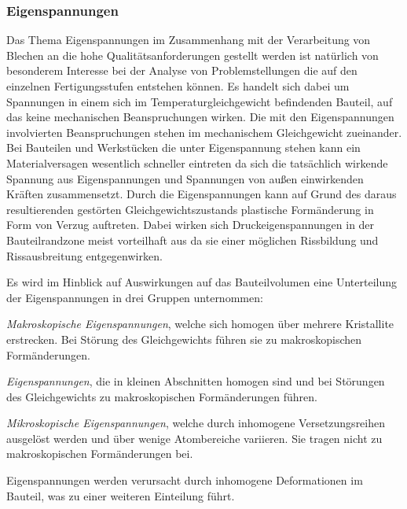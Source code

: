 \documentclass[12pt,a4paper,parskip]{scrartcl}
\begin{document}
{\subsubsection{Eigenspannungen}
Das Thema Eigenspannungen im Zusammenhang mit der Verarbeitung von Blechen an die hohe Qualitätsanforderungen gestellt werden ist natürlich von besonderem Interesse bei der Analyse von Problemstellungen die auf den einzelnen Fertigungsstufen entstehen können. Es handelt sich dabei um Spannungen in einem sich im Temperaturgleichgewicht befindenden Bauteil, auf das keine mechanischen Beanspruchungen wirken. Die mit den Eigenspannungen involvierten  Beanspruchungen stehen im mechanischem Gleichgewicht zueinander. Bei Bauteilen und Werkstücken die unter Eigenspannung stehen kann ein Materialversagen wesentlich schneller eintreten da sich die tatsächlich wirkende Spannung aus Eigenspannungen und Spannungen von außen einwirkenden Kräften zusammensetzt. Durch die Eigenspannungen kann auf Grund des daraus resultierenden gestörten Gleichgewichtszustands plastische Formänderung in Form von Verzug auftreten.
Dabei wirken sich Druckeigenspannungen in der Bauteilrandzone meist vorteilhaft aus da sie einer möglichen Rissbildung und Rissausbreitung entgegenwirken.

Es wird im Hinblick auf Auswirkungen auf das Bauteilvolumen eine Unterteilung der Eigenspannungen in drei Gruppen unternommen:
\begin{enumerate*}
\item \emph{Makroskopische Eigenspannungen}, welche sich homogen über mehrere Kristallite erstrecken. Bei Störung des Gleichgewichts führen sie zu makroskopischen Formänderungen.
\item \emph{Eigenspannungen}, die in kleinen Abschnitten homogen sind und bei Störungen des Gleichgewichts zu makroskopischen Formänderungen führen.
\item \emph{Mikroskopische Eigenspannungen}, welche durch inhomogene Versetzungsreihen ausgelöst werden und über wenige Atombereiche variieren. Sie tragen nicht zu makroskopischen Formänderungen bei. 


\end{enumerate*}

Eigenspannungen werden verursacht durch inhomogene Deformationen im Bauteil, was zu einer weiteren Einteilung führt.

}
\end{document}
